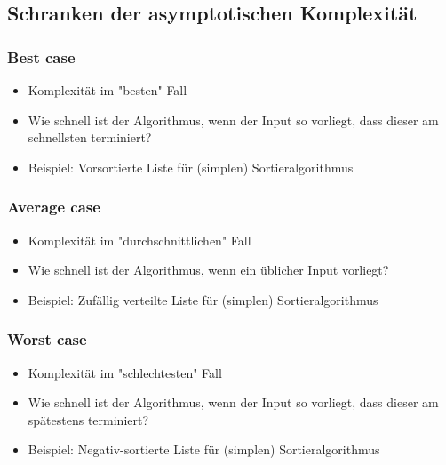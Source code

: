 	\subsection{Schranken der asymptotischen Komplexität}
		\begin{minipage}[t]{0.32\textwidth}
			\subsubsection{Best case}
				\begin{itemize}
					\item Komplexität im "besten" Fall
					\item Wie schnell ist der Algorithmus, wenn der Input so vorliegt, dass dieser am schnellsten terminiert?
					\item Beispiel: Vorsortierte Liste für (simplen) Sortieralgorithmus
				\end{itemize}
		\end{minipage}
		\begin{minipage}[t]{0.32\textwidth}
					\subsubsection{Average case}
						\begin{itemize}
							\item Komplexität im "durchschnittlichen" Fall
							\item Wie schnell ist der Algorithmus, wenn ein üblicher Input vorliegt?
							\item Beispiel: Zufällig verteilte Liste für (simplen) Sortieralgorithmus
						\end{itemize}
		\end{minipage}
		\begin{minipage}[t]{0.32\textwidth}
			\subsubsection{Worst case}
				\begin{itemize}
					\item Komplexität im "schlechtesten" Fall
					\item Wie schnell ist der Algorithmus, wenn der Input so vorliegt, dass dieser am spätestens terminiert?
					\item Beispiel: Negativ-sortierte Liste für (simplen) Sortieralgorithmus
				\end{itemize}
		\end{minipage}


